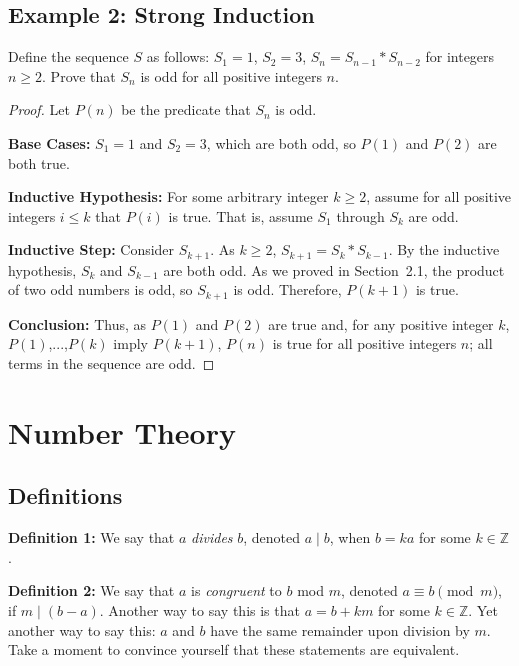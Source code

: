 \documentclass[12pt,letterpaper]{article}
\newcommand\Z{\mathbb Z}
\begin{document}
\subsection{Example 2: Strong Induction}
\begin{mdframed} Define the sequence $S$ as follows: $S_1 = 1$, $S_2 = 3$, $S_n = S_{n-1} * S_{n-2}$ for integers $n \geq 2$. Prove that $S_n$ is odd for all positive integers $n$.

\begin{proof} Let $P(n)$ be the predicate that $S_n$ is odd.

\textbf{Base Cases:} $S_1 = 1$ and $S_2 = 3$, which are both odd, so $P(1)$ and $P(2)$ are both true.

\textbf{Inductive Hypothesis:} For some arbitrary integer $k \geq 2$, assume for all positive integers $i \leq k$ that $P(i)$ is true. That is, assume $S_1$ through $S_k$ are odd.

\textbf{Inductive Step:} Consider $S_{k+1}$. As $k \geq 2$, $S_{k+1} = S_k * S_{k-1}$. By the inductive hypothesis, $S_k$ and $S_{k-1}$ are both odd. As we proved in Section~2.1, the product of two odd numbers is odd, so $S_{k+1}$ is odd. Therefore, $P(k+1)$ is true.

\textbf{Conclusion:} Thus, as $P(1)$ and $P(2)$ are true and, for any positive integer $k$, $P(1)$,...,$P(k)$ imply $P(k+1)$, $P(n)$ is true for all positive integers $n$; all terms in the sequence are odd.
\end{proof}
\end{mdframed}

\section{Number Theory}

\subsection{Definitions}

    \textbf{Definition 1:} We say that $a$ \textit{divides} $b$, denoted $a \mid b$, when $b = ka$ for some $k \in \Z$. 

    \textbf{Definition 2:} We say that $a$ is \textit{congruent} to $b$ mod $m$, denoted $a \equiv b \pmod m$, if $m \mid (b-a)$. Another way to say this is that $a = b + km$ for some $k \in \Z$. Yet another way to say this: $a$ and $b$ have the same remainder upon division by $m$. Take a moment to convince yourself that these statements are equivalent. 
    
\end{document}
